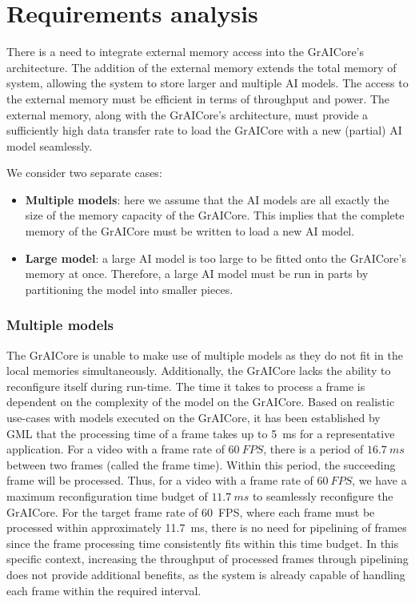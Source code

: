 \section{Requirements analysis}
There is a need to integrate external memory access into the GrAICore's architecture.
The addition of the external memory extends the total memory of system, allowing the system to store larger and multiple AI models.
The access to the external memory must be efficient in terms of throughput and power.
The external memory, along with the GrAICore’s architecture, must provide a sufficiently high data transfer rate to load the GrAICore with a new (partial) AI model seamlessly.

We consider two separate cases:
\begin{itemize}
    \item \textbf{Multiple models}: here we assume that the AI models are all exactly the size of the memory capacity of the GrAICore.
    This implies that the complete memory of the GrAICore must be written to load a new AI model.
    \item \textbf{Large model}: a large AI model is too large to be fitted onto the GrAICore's memory at once.
    Therefore, a large AI model must be run in parts by partitioning the model into smaller pieces.
\end{itemize}

\subsubsection{Multiple models}
The GrAICore is unable to make use of multiple models as they do not fit in the local memories simultaneously.
Additionally, the GrAICore lacks the ability to reconfigure itself during run-time.
The time it takes to process a frame is dependent on the complexity of the model on the GrAICore.
Based on realistic use-cases with models executed on the GrAICore, it has been established by GML that the processing time of a frame takes up to \SI{5}{ms} for a representative application.
For a video with a frame rate of $\SI{60}{FPS}$, there is a period of $\SI{16.7}{ms}$ between two frames (called the frame time).
Within this period, the succeeding frame will be processed.
Thus, for a video with a frame rate of $\SI{60}{FPS}$, we have a maximum reconfiguration time budget of $\SI{11.7}{ms}$ to seamlessly reconfigure the GrAICore.
For the target frame rate of \SI{60}{FPS}, where each frame must be processed within approximately \SI{11.7}{ms}, there is no need for pipelining of frames since the frame processing time consistently fits within this time budget.
In this specific context, increasing the throughput of processed frames through pipelining does not provide additional benefits, as the system is already capable of handling each frame within the required interval.

